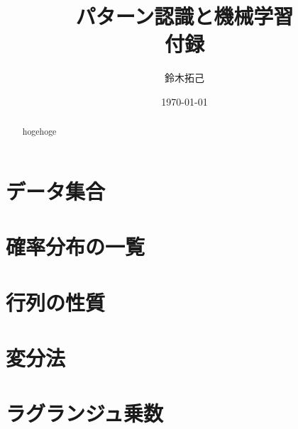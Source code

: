 \documentclass[uplatex,a4paper,oneside,openany,dvipdfmx]{jsarticle}
\title{パターン認識と機械学習\\付録}
\author{鈴木拓己}
\date{\today}
\numberwithin{equation}{section}
\theoremstyle{mystyle} %
\begin{document}
\maketitle
\setcounter{tocdepth}{3}

\tableofcontents

\begin{abstract}
    hogehoge
\end{abstract}

\renewcommand{\thesection}{\Alph{section}}
\renewcommand{\thesubsection}{\thesection-\arabic{subsection}}

\section{データ集合}

\section{確率分布の一覧}

\section{行列の性質}

\section{変分法}

\section{ラグランジュ乗数}
\end{document}
